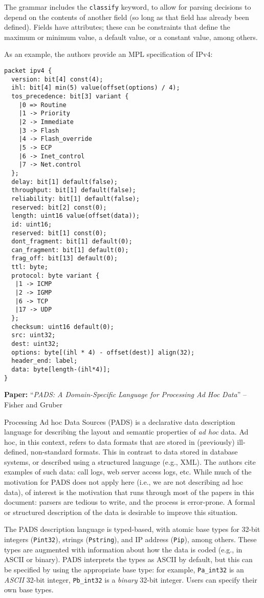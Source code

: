 \documentclass[10pt,a4paper]{article}
\newcommand{\paper}[3]{\vspace{4mm}\noindent\textbf{Paper:} ``\textit{#1}'' -- #2 \cite{#3}\vspace{3mm}}
\begin{document}
The grammar includes the \texttt{classify} keyword, to allow for parsing decisions to
depend on the contents of another field (so long as that field has already been defined).
Fields have attributes; these can be constraints that define the maximum or minimum value,
a default value, or a constant value, among others. 

As an example, the authors provide an MPL specification of IPv4:

\begin{verbatim}
packet ipv4 {
  version: bit[4] const(4);
  ihl: bit[4] min(5) value(offset(options) / 4);
  tos_precedence: bit[3] variant {
    |0 => Routine
    |1 -> Priority
    |2 -> Immediate
    |3 -> Flash
    |4 -> Flash_override
    |5 -> ECP
    |6 -> Inet_control
    |7 -> Net.control
  };
  delay: bit[1] default(false);
  throughput: bit[1] default(false);
  reliability: bit[1] default(false);
  reserved: bit[2] const(0);
  length: uint16 value(offset(data));
  id: uint16;
  reserved: bit[1] const(0);
  dont_fragment: bit[1] default(0);
  can_fragment: bit[1] default(0);
  frag_off: bit[13] default(0);
  ttl: byte;
  protocol: byte variant {
   |1 -> ICMP
   |2 -> IGMP
   |6 -> TCP
   |17 -> UDP
  };
  checksum: uint16 default(0);
  src: uint32;
  dest: uint32;
  options: byte[(ihl * 4) - offset(dest)] align(32);
  header_end: label;
  data: byte[length-(ihl*4)];
}
\end{verbatim}

\paper{PADS: A Domain-Specific Language for Processing Ad Hoc Data}{Fisher and Gruber}{fisher2005pads}

Processing Ad hoc Data Sources (PADS) is a declarative data description language for
describing the layout and semantic properties of \emph{ad hoc} data. Ad hoc, in this
context, refers to data formats that are stored in (previously) ill-defined, non-standard
formats. This in contrast to data stored in database systems, or described using a
structured language (e.g., XML). The authors cite examples of such data: call logs, web
server access logs, etc. While much of the motivation for PADS does not apply here (i.e.,
we are not describing ad hoc data), of interest is the motivation that runs through most
of the papers in this document: parsers are tedious to write, and the process is
error-prone. A formal or structured description of the data is desirable to improve this
situation.

The PADS description language is typed-based, with atomic base types for 32-bit integers
(\texttt{Pint32}), strings (\texttt{Pstring}), and IP address (\texttt{Pip}), among
others. These types are augmented with information about how the data is coded (e.g., in
ASCII or binary). PADS interprets the types as ASCII by default, but this can be specified
by using the appropriate base type: for example, \texttt{Pa\_int32} is an \emph{ASCII}
32-bit integer, \texttt{Pb\_int32} is a \emph{binary} 32-bit integer. Users can specify
their own base types.
\end{document}
